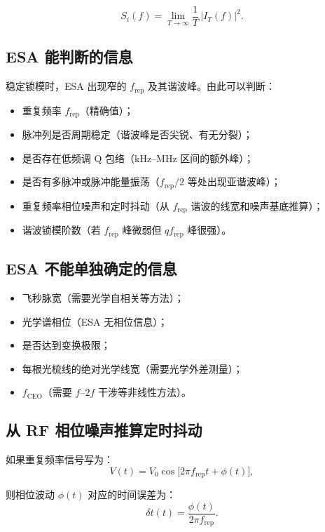 \documentclass[11pt,a4paper]{article}
\newcommand{\rep}{f_{\text{rep}}}
\newcommand{\ceo}{f_{\text{CEO}}}
\begin{document}
\begin{equation}\label{eq:esa_definition}
S_i(f) = \lim_{T\to\infty} \frac{1}{T}\,|I_T(f)|^2.
\end{equation}

\subsection{ESA 能判断的信息}

稳定锁模时，ESA 出现窄的 $\rep$ 及其谐波峰。由此可以判断：
\begin{itemize}
    \item 重复频率 $\rep$（精确值）；
    \item 脉冲列是否周期稳定（谐波峰是否尖锐、有无分裂）；
    \item 是否存在低频调 Q 包络（kHz--MHz 区间的额外峰）；
    \item 是否有多脉冲或脉冲能量振荡（$\rep/2$ 等处出现亚谐波峰）；
    \item 重复频率相位噪声和定时抖动（从 $\rep$ 谐波的线宽和噪声基底推算）；
    \item 谐波锁模阶数（若 $\rep$ 峰微弱但 $q\rep$ 峰很强）。
\end{itemize}

\subsection{ESA 不能单独确定的信息}

\begin{itemize}
    \item 飞秒脉宽（需要光学自相关等方法）；
    \item 光学谱相位（ESA 无相位信息）；
    \item 是否达到变换极限；
    \item 每根光梳线的绝对光学线宽（需要光学外差测量）；
    \item $\ceo$（需要 $f\text{--}2f$ 干涉等非线性方法）。
\end{itemize}

\subsection{从 RF 相位噪声推算定时抖动}

如果重复频率信号写为：
\begin{equation}\label{eq:rf_with_phase_noise}
V(t) = V_0\cos\!\big[2\pi\rep t + \phi(t)\big],
\end{equation}

则相位波动 $\phi(t)$ 对应的时间误差为：
\begin{equation}\label{eq:timing_error}
\delta t(t) = \frac{\phi(t)}{2\pi\rep}.
\end{equation}
\end{document}

